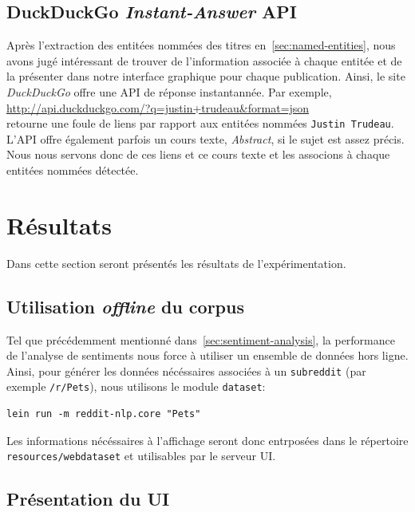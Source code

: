 \documentclass[12pt]{article}
\begin{document}
\subsection{DuckDuckGo \textit{Instant-Answer} API}

Après l'extraction des entitées nommées des titres en~\ref{sec:named-entities}, nous avons jugé intéressant de trouver de l'information associée à chaque entitée et de la présenter dans notre interface graphique pour chaque publication. Ainsi, le site \textit{DuckDuckGo} offre une API de réponse instantannée. Par exemple,\\

\url{http://api.duckduckgo.com/?q=justin+trudeau&format=json}\\

retourne une foule de liens par rapport aux entitées nommées \verb;Justin Trudeau;. L'API offre également parfois un cours texte, \textit{Abstract}, si le sujet est assez précis. Nous nous servons donc de ces liens et ce cours texte et les associons à chaque entitées nommées détectée.

\section{Résultats}

Dans cette section seront présentés les résultats de l'expérimentation.

\subsection{Utilisation \textit{offline} du corpus}
Tel que précédemment mentionné dans~\ref{sec:sentiment-analysis}, la performance de l'analyse de sentiments nous force à utiliser un ensemble de données hors ligne. Ainsi, pour générer les données nécéssaires associées à un \verb;subreddit; (par exemple \verb;/r/Pets;), nous utilisons le module \verb;dataset;:

\begin{verbatim}
lein run -m reddit-nlp.core "Pets"
\end{verbatim}

Les informations nécéssaires à l'affichage seront donc entrposées dans le répertoire \verb;resources/webdataset; et utilisables par le serveur UI.

\subsection{Présentation du UI}
\end{document}
